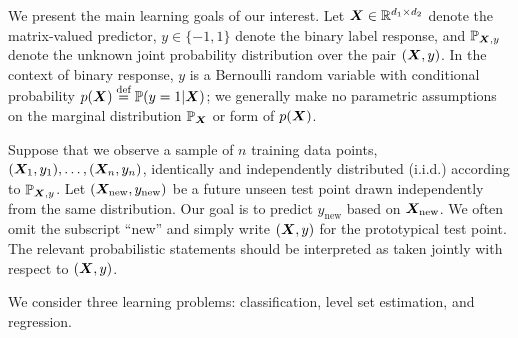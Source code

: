 \documentclass[11pt]{article}
\theoremstyle{definition}
\begin{document}
We present the main learning goals of our interest. Let $\bm X\in\mathbb{R}^{d_1\times d_2}$ denote the matrix-valued predictor, $y\in\{-1,1\}$ denote the binary label response, and $\mathbb{P}_{\bm X,y}$ denote the unknown joint probability distribution over the pair $(\bm X,y)$. In the context of binary response, $y$ is a Bernoulli random variable with conditional probability $p(\bm X)\stackrel{\text{def}}{=}\mathbb{P}(y=1|\bm X)$; we generally make no parametric assumptions on the marginal distribution $\mathbb{P}_{\bm X}$ or form of $p(\bm X)$. 


Suppose that we observe a sample of $n$ training data points, $(\bm X_1,y_1),\ldots,(\bm X_n,y_n)$, identically and independently distributed (i.i.d.) according to $\mathbb{P}_{\bm X,y}$. Let $(\bm X_{\text{new}},y_{\text{new}})$ be a future unseen test point drawn independently from the same distribution. Our goal is to predict $y_{\text{new}}$ based on $\bm X_{\text{new}}$. We often omit the subscript ``new'' and simply write $(\bm X,y)$ for the prototypical test point. The relevant probabilistic statements should be interpreted as taken jointly with respect to $(\bm X,y)$.

We consider three learning problems: classification, level set estimation, and regression. 
\end{document}
